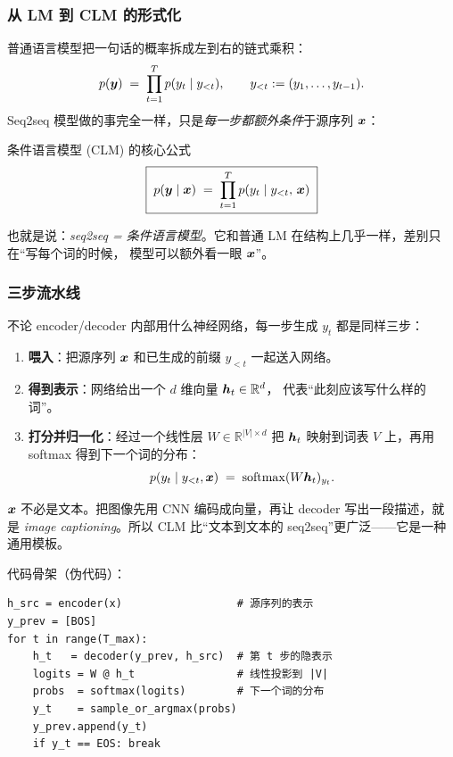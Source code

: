 \subsubsection{从 LM 到 CLM 的形式化}

普通语言模型把一句话的概率拆成左到右的链式乘积：
\[
    p(\boldsymbol{y}) \;=\; \prod_{t=1}^{T} p(y_t \mid y_{<t}),
    \qquad y_{<t} := (y_1, \dots, y_{t-1}).
\]
Seq2seq 模型做的事完全一样，只是\emph{每一步都额外条件}于源序列 $\boldsymbol{x}$：
\begin{mathbox}{条件语言模型 (CLM) 的核心公式}
\[
    \boxed{\;
    p(\boldsymbol{y} \mid \boldsymbol{x}) \;=\; \prod_{t=1}^{T} p(y_t \mid y_{<t},\, \boldsymbol{x})
    \;}
\]
\end{mathbox}

也就是说：\emph{seq2seq = 条件语言模型}。它和普通 LM 在结构上几乎一样，差别只在“写每个词的时候，
模型可以额外看一眼 $\boldsymbol{x}$”。

\subsubsection{三步流水线}

不论 encoder/decoder 内部用什么神经网络，每一步生成 $y_t$ 都是同样三步：
\begin{enumerate}
    \item \textbf{喂入}：把源序列 $\boldsymbol{x}$ 和已生成的前缀 $y_{<t}$ 一起送入网络。
    \item \textbf{得到表示}：网络给出一个 $d$ 维向量 $\boldsymbol{h}_t \in \mathbb{R}^d$，
          代表“此刻应该写什么样的词”。
    \item \textbf{打分并归一化}：经过一个线性层 $W \in \mathbb{R}^{|V|\times d}$ 把
          $\boldsymbol{h}_t$ 映射到词表 $V$ 上，再用 softmax 得到下一个词的分布：
          \[
              p(y_t \mid y_{<t}, \boldsymbol{x})
              \;=\; \mathrm{softmax}(W \boldsymbol{h}_t)_{y_t}.
          \]
\end{enumerate}

\begin{remark}
$\boldsymbol{x}$ 不必是文本。把图像先用 CNN 编码成向量，再让 decoder 写出一段描述，就是
\emph{image captioning}。所以 CLM 比“文本到文本的 seq2seq”更广泛——它是一种通用模板。
\end{remark}

\begin{engbox}
代码骨架（伪代码）：
\begin{lstlisting}
h_src = encoder(x)                  # 源序列的表示
y_prev = [BOS]
for t in range(T_max):
    h_t   = decoder(y_prev, h_src)  # 第 t 步的隐表示
    logits = W @ h_t                # 线性投影到 |V|
    probs  = softmax(logits)        # 下一个词的分布
    y_t    = sample_or_argmax(probs)
    y_prev.append(y_t)
    if y_t == EOS: break
\end{lstlisting}
\end{engbox}

